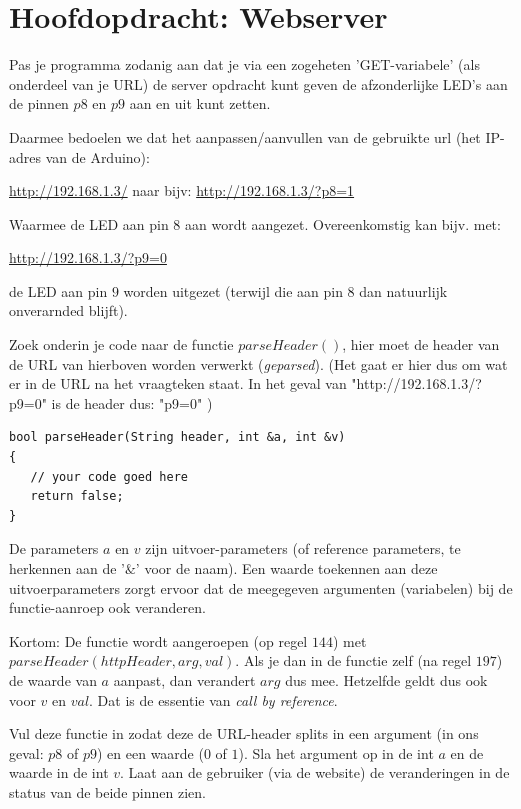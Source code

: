 \newpage
\section{Hoofdopdracht: Webserver}
\vspace{3mm}
\begin{exercise}
Pas je programma zodanig aan dat je via een zogeheten 'GET-variabele' (als onderdeel van je URL) de server opdracht kunt geven de afzonderlijke LED’s aan de pinnen $p8$ en $p9$ aan en uit kunt zetten. 

Daarmee bedoelen we dat het aanpassen/aanvullen van de gebruikte url (het IP-adres van de Arduino):

\url{http://192.168.1.3/} naar bijv: \url{http://192.168.1.3/?p8=1}

Waarmee de LED aan pin $8$ aan wordt aangezet. Overeenkomstig kan bijv. met:

\url{http://192.168.1.3/?p9=0} 

de LED aan pin $9$ worden uitgezet (terwijl die aan pin 8 dan natuurlijk onverarnded blijft). 

Zoek onderin je code naar de functie $parseHeader()$, hier moet de header van de URL van hierboven worden verwerkt (\textit{geparsed}). (Het gaat er hier dus om wat er in de URL na het vraagteken staat. In het geval van "http://192.168.1.3/?p9=0" is de header dus: "p9=0" ) 

\begin{lstlisting}[language=Arduino, numbers=none]
bool parseHeader(String header, int &a, int &v)
{
   // your code goed here 
   return false;
}
\end{lstlisting}

\begin{remark}
De parameters $a$ en $v$ zijn uitvoer-parameters (of reference parameters, te herkennen aan de '$\&$' voor de naam). Een waarde toekennen aan deze uitvoerparameters zorgt ervoor dat de meegegeven argumenten (variabelen) bij de functie-aanroep ook veranderen. 

Kortom: De functie wordt aangeroepen (op regel $144$) met $parseHeader(httpHeader, arg, val)$. Als je dan in de functie zelf (na regel $197$) de waarde van $a$ aanpast, dan verandert $arg$ dus mee. Hetzelfde geldt dus ook voor $v$ en $val$. Dat is de essentie van \textit{call by reference}. 
\end{remark}

Vul deze functie in zodat deze de URL-header splits in een argument (in ons geval: $p8$ of $p9$) en een waarde ($0$ of $1$). Sla het argument op in de int $a$ en de waarde in de int $v$. Laat aan de gebruiker (via de website) de veranderingen in de status van de beide pinnen zien. 


\end{exercise}
